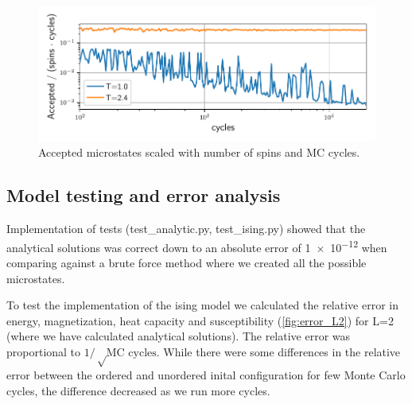 \begin{figure}[H]
  \centering
  \includegraphics[width=\textwidth]{../figures/accepted.pdf}
  \caption{Accepted microstates scaled with number of spins and MC cycles.}
  \label{fig:accepted}
\end{figure}

\subsection{Model testing and error analysis}

Implementation of tests (test\_analytic.py, test\_ising.py) showed that the
analytical solutions was correct down to an absolute error of \num{1e-12}  when
comparing against a brute force method where we created all the possible
microstates.


To test the implementation of the ising model we calculated the relative error
in energy, magnetization, heat capacity and susceptibility (\cref{fig:error_L2})
for L=2 (where we have calculated analytical solutions). The relative error
was proportional to $1/ \sqrt \text{MC cycles}$. While there were some
differences in the relative error between the ordered and unordered inital
configuration for few Monte Carlo cycles, the difference decreased as we run more
cycles.

